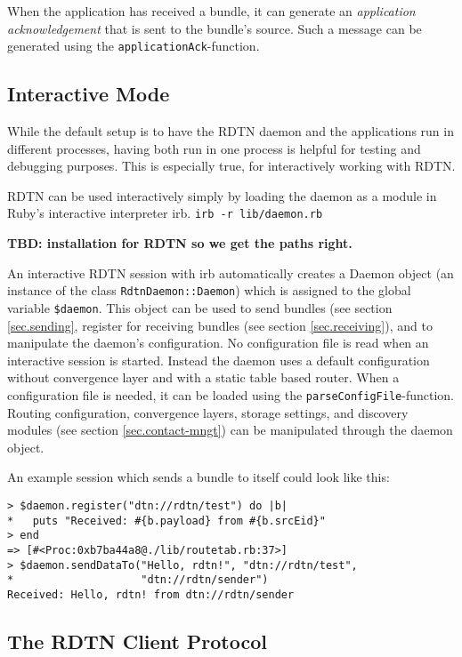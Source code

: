 \documentclass{article}
\begin{document}
When the application has received a bundle, it can generate an {\em application
acknowledgement} that is sent to the bundle's source. Such a message can be
generated using the {\tt applicationAck}-function.

\subsection{Interactive Mode}\label{sec.interactive}

While the default setup is to have the RDTN daemon and the applications run in
different processes, having both run in one process is helpful for testing and
debugging purposes. This is especially true, for interactively working with
RDTN. 

RDTN can be used interactively simply by loading the daemon as a module in
Ruby's interactive interpreter irb. {\tt irb -r lib/daemon.rb}

{\bf TBD: installation for RDTN so we get the paths right.}

An interactive RDTN session with irb automatically creates a Daemon object (an
instance of the class {\tt RdtnDaemon::Daemon}) which is assigned to the global
variable {\tt \$daemon}. This object can be used to send bundles (see section
\ref{sec.sending}, register for receiving bundles (see section
\ref{sec.receiving}), and to manipulate the daemon's configuration. No
configuration file is read when an interactive session is started. Instead the
daemon uses a default configuration without convergence layer and with a static
table based router. When a configuration file is needed, it can be loaded
using the {\tt parseConfigFile}-function. Routing configuration, convergence
layers, storage settings, and discovery modules (see section
\ref{sec.contact-mngt}) can be manipulated through the daemon object.

An example session which sends a bundle to itself could look like this:

\begin{verbatim}
> $daemon.register("dtn://rdtn/test") do |b|
*   puts "Received: #{b.payload} from #{b.srcEid}"
> end
=> [#<Proc:0xb7ba44a8@./lib/routetab.rb:37>]
> $daemon.sendDataTo("Hello, rdtn!", "dtn://rdtn/test",
*                    "dtn://rdtn/sender")
Received: Hello, rdtn! from dtn://rdtn/sender
\end{verbatim}

\subsection{The RDTN Client Protocol}\label{sec.client-protocol}
\end{document}
